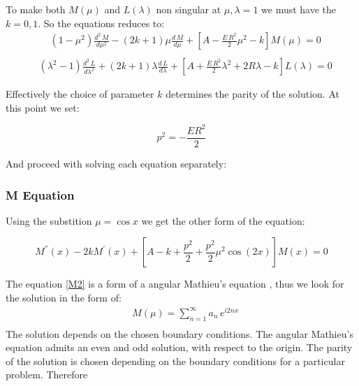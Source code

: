 To make both $ M(\mu) $ and $ L(\lambda) $ non singular at $ \mu, \lambda= 1$ we must have the $ k = 0, 1 $. So the equations reduces to:
\begin{equation}\label{M1}
\begin{split}
& (1-\mu^2)\frac{d^2\,M}{d\mu^2}  - (2k+1)\mu\frac{d\,M}{d\mu} +   \left[ A -  \frac{E\,R^2}{2}\mu^2  -  k  \right]M(\mu) = 0 \\[.8em]
\end{split}
\end{equation}
\begin{equation}\label{L1}
\begin{split}
& (\lambda^2-1)\frac{d^2\,L}{d\lambda^2} + (2k+1)\lambda \frac{d\,L}{d\lambda} +  \left[A + \frac{E\,R^2}{2}\lambda^2 + 2R\lambda  -k \right]L(\lambda) = 0
\end{split}
\end{equation}

Effectively the choice of parameter $ k $ determines the parity of the solution. At this point we set:

\begin{equation}
p^2 = -\frac{ER^2}{2}
\end{equation}

And proceed with solving each equation separately:

\subsubsection{ M Equation }

Using the substition $ \mu = \cos x $ we get the other form of the equation:

\begin{equation}\label{M2}
M^{''}(x) - 2k M^{'}(x) +   \left[ A - k + \frac{p^2}{2} + \frac{p^2}{2}\mu^2\cos(2x)  \right]M(x) = 0
\end{equation}

The equation \eqref{M2} is a form of a angular Mathieu's equation \cite{Mathieu2}, thus we look for the solution in the form of:
\begin{equation}\label{MSol}
\begin{split}
& M(\mu) = \sum_{n=1}^{\infty}{a_n\,e^{i2nx}} \\[.8em]
\end{split}
\end{equation}
The solution depends on the chosen boundary conditions. The angular Mathieu's equation admits an even and odd solution, with respect to the origin. The parity of the solution is chosen depending on the boundary conditions for a particular problem. Therefore

